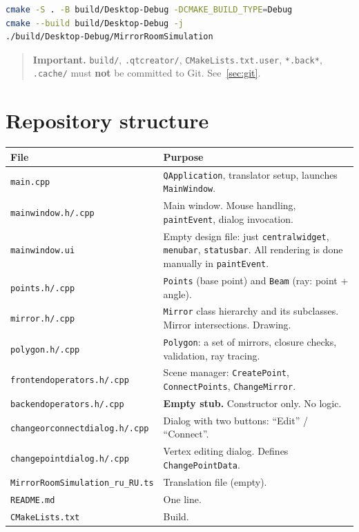 \documentclass[a4paper,11pt]{article}
\newcommand{\file}[1]{\texttt{#1}}
\newcommand{\code}[1]{\texttt{#1}}
\begin{document}
\begin{lstlisting}[language=bash,caption={Build}]
cmake -S . -B build/Desktop-Debug -DCMAKE_BUILD_TYPE=Debug
cmake --build build/Desktop-Debug -j
./build/Desktop-Debug/MirrorRoomSimulation
\end{lstlisting}

\begin{quote}
\textbf{Important.} \file{build/}, \file{.qtcreator/},
\file{CMakeLists.txt.user}, \file{*.back*}, \file{.cache/} must
\textbf{not} be committed to Git. See~\ref{sec:git}.
\end{quote}

\section{Repository structure}

\begin{longtable}{@{}p{5.8cm}p{8.7cm}@{}}
\toprule
\textbf{File} & \textbf{Purpose} \\ \midrule
\endhead
\file{main.cpp} & \code{QApplication}, translator setup, launches \code{MainWindow}. \\
\file{mainwindow.h/.cpp} & Main window. Mouse handling, \code{paintEvent}, dialog invocation. \\
\file{mainwindow.ui} & Empty design file: just \code{centralwidget}, \code{menubar}, \code{statusbar}. All rendering is done manually in \code{paintEvent}. \\
\file{points.h/.cpp} & \code{Points} (base point) and \code{Beam} (ray: point + angle). \\
\file{mirror.h/.cpp} & \code{Mirror} class hierarchy and its subclasses. Mirror intersections. Drawing. \\
\file{polygon.h/.cpp} & \code{Polygon}: a set of mirrors, closure checks, validation, ray tracing. \\
\file{frontendoperators.h/.cpp} & Scene manager: \code{CreatePoint}, \code{ConnectPoints}, \code{ChangeMirror}. \\
\file{backendoperators.h/.cpp} & \textbf{Empty stub.} Constructor only. No logic. \\
\file{changeorconnectdialog.h/.cpp} & Dialog with two buttons: ``Edit'' / ``Connect''. \\
\file{changepointdialog.h/.cpp} & Vertex editing dialog. Defines \code{ChangePointData}. \\
\file{MirrorRoomSimulation\_ru\_RU.ts} & Translation file (empty). \\
\file{README.md} & One line. \\
\file{CMakeLists.txt} & Build. \\
\bottomrule
\end{longtable}
\end{document}
